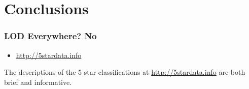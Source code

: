 \section{Conclusions}
\startslide
\frame
{
  \frametitle{LOD Everywhere? No}
  \begin{center}
  \end{center}
  \begin{itemize}
    \item \url{http://5stardata.info}
  \end{itemize}
}
\slideend
The descriptions of the 5 star classifications at \url{http://5stardata.info} are both brief and informative.
\startslide
\frame
